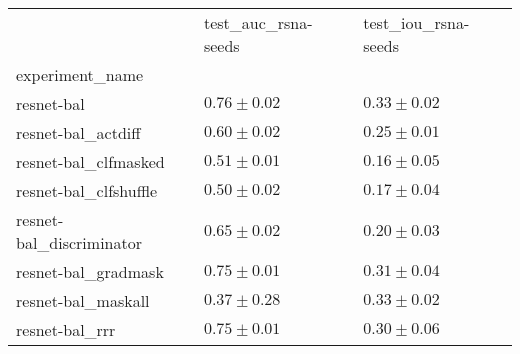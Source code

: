 \begin{tabular}{lll}
\toprule
{} & test_auc_rsna-seeds & test_iou_rsna-seeds \\
experiment_name          &                     &                     \\
\midrule
resnet-bal               &       $0.76\pm0.02$ &       $0.33\pm0.02$ \\
resnet-bal_actdiff       &       $0.60\pm0.02$ &       $0.25\pm0.01$ \\
resnet-bal_clfmasked     &       $0.51\pm0.01$ &       $0.16\pm0.05$ \\
resnet-bal_clfshuffle    &       $0.50\pm0.02$ &       $0.17\pm0.04$ \\
resnet-bal_discriminator &       $0.65\pm0.02$ &       $0.20\pm0.03$ \\
resnet-bal_gradmask      &       $0.75\pm0.01$ &       $0.31\pm0.04$ \\
resnet-bal_maskall       &       $0.37\pm0.28$ &       $0.33\pm0.02$ \\
resnet-bal_rrr           &       $0.75\pm0.01$ &       $0.30\pm0.06$ \\
\bottomrule
\end{tabular}
